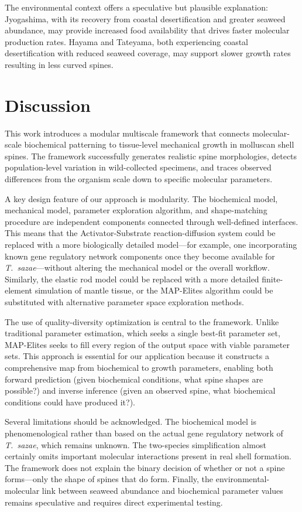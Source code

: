 \documentclass[11pt]{article}
\begin{document}
The environmental context offers a speculative but plausible explanation: Jyogashima, with its recovery from coastal desertification and greater seaweed abundance, may provide increased food availability that drives faster molecular production rates. Hayama and Tateyama, both experiencing coastal desertification with reduced seaweed coverage, may support slower growth rates resulting in less curved spines.

\section{Discussion}

This work introduces a modular multiscale framework that connects molecular-scale biochemical patterning to tissue-level mechanical growth in molluscan shell spines. The framework successfully generates realistic spine morphologies, detects population-level variation in wild-collected specimens, and traces observed differences from the organism scale down to specific molecular parameters.

A key design feature of our approach is modularity. The biochemical model, mechanical model, parameter exploration algorithm, and shape-matching procedure are independent components connected through well-defined interfaces. This means that the Activator-Substrate reaction-diffusion system could be replaced with a more biologically detailed model---for example, one incorporating known gene regulatory network components once they become available for \textit{T.\ sazae}---without altering the mechanical model or the overall workflow. Similarly, the elastic rod model could be replaced with a more detailed finite-element simulation of mantle tissue, or the MAP-Elites algorithm could be substituted with alternative parameter space exploration methods.

The use of quality-diversity optimization \citep{mouret2015} is central to the framework. Unlike traditional parameter estimation, which seeks a single best-fit parameter set, MAP-Elites seeks to fill every region of the output space with viable parameter sets. This approach is essential for our application because it constructs a comprehensive map from biochemical to growth parameters, enabling both forward prediction (given biochemical conditions, what spine shapes are possible?) and inverse inference (given an observed spine, what biochemical conditions could have produced it?).

Several limitations should be acknowledged. The biochemical model is phenomenological rather than based on the actual gene regulatory network of \textit{T.\ sazae}, which remains unknown. The two-species simplification almost certainly omits important molecular interactions present in real shell formation. The framework does not explain the binary decision of whether or not a spine forms---only the shape of spines that do form. Finally, the environmental-molecular link between seaweed abundance and biochemical parameter values remains speculative and requires direct experimental testing.
\end{document}
